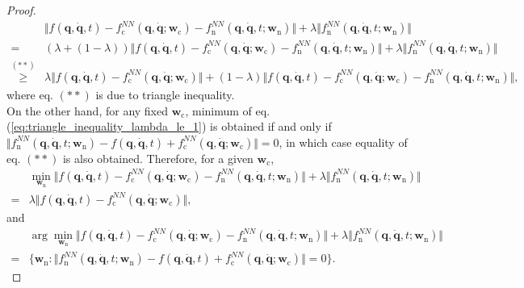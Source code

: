 \documentclass[aps,pre,reprint,superscriptaddress,nofootinbib,amsmath,amssymb]{revtex4-2}
\newcommand{\mat}[1]{\mathbf{#1}}
\newcommand{\q}{\mat{q}}
\newcommand{\qd}{\dot{\mat{q}}}
\begin{document}
\begin{proof}
	\begin{align}
		\nonumber
		&\Vert f(\q,\qd,t)-f_{\mathrm{c}}^{NN}(\q,\qd;\boldsymbol{w}_{\mathrm{c}})-f_{\mathrm{n}}^{NN}(\q,\qd,t;\boldsymbol{w}_{\mathrm{n}})\Vert +\lambda \Vert f_{\mathrm{n}}^{NN}(\q,\qd,t;\boldsymbol{w}_{\mathrm{n}})\Vert
		\\
		\nonumber
		=&(\lambda+(1-\lambda))\Vert f(\q,\qd,t)-f_{\mathrm{c}}^{NN}(\q,\qd;\boldsymbol{w}_{\mathrm{c}})-f_{\mathrm{n}}^{NN}(\q,\qd,t;\boldsymbol{w}_{\mathrm{n}})\Vert+\lambda\Vert f_{\mathrm{n}}^{NN}(\q,\qd,t;\boldsymbol{w}_{\mathrm{n}})\Vert 
		\\
		\label{eq:triangle_inequality_lambda_le_1}
		\overset{(**)}{\ge}& \lambda\Vert f(\q,\qd,t)-f_{\mathrm{c}}^{NN}(\q,\qd;\boldsymbol{w}_{\mathrm{c}})\Vert
		+(1-\lambda) \Vert f(\q,\qd,t)-f_{\mathrm{c}}^{NN}(\q,\qd;\boldsymbol{w}_{\mathrm{c}})-f_{\mathrm{n}}^{NN}(\q,\qd,t;\boldsymbol{w}_{\mathrm{n}})\Vert,
	\end{align}
	where eq. $(**)$ is due to triangle inequality.
	\\
	On the other hand, for any fixed $\boldsymbol{w}_{\mathrm{c}}$, minimum of eq. (\ref{eq:triangle_inequality_lambda_le_1}) is obtained if and only if $\Vert f_{\mathrm{n}}^{NN}(\q,\qd,t;\boldsymbol{w}_{\mathrm{n}})-f(\q,\qd,t)+f_{\mathrm{c}}^{NN}(\q,\qd;\boldsymbol{w}_{\mathrm{c}})\Vert=0$, in which case equality of eq. $(**)$ is also obtained. Therefore, for a given $\boldsymbol{w}_{\mathrm{c}}$,
	\begin{align*}
		&\min_{\boldsymbol{w}_{\mathrm{n}}}\Vert f(\q,\qd,t)-f_{\mathrm{c}}^{NN}(\q,\qd;\boldsymbol{w}_{\mathrm{c}})-f_{\mathrm{n}}^{NN}(\q,\qd,t;\boldsymbol{w}_{\mathrm{n}})\Vert +\lambda \Vert f_{\mathrm{n}}^{NN}(\q,\qd,t;\boldsymbol{w}_{\mathrm{n}})\Vert
		\\
		=&\lambda\Vert f(\q,\qd,t)-f_{\mathrm{c}}^{NN}(\q,\qd;\boldsymbol{w}_{\mathrm{c}})\Vert,
	\end{align*}
	and 
	\begin{align}
		\nonumber
		&\arg\min_{\boldsymbol{w}_{\mathrm{n}}}\Vert f(\q,\qd,t)-f_{\mathrm{c}}^{NN}(\q,\qd;\boldsymbol{w}_{\mathrm{c}})-f_{\mathrm{n}}^{NN}(\q,\qd,t;\boldsymbol{w}_{\mathrm{n}})\Vert +\lambda \Vert f_{\mathrm{n}}^{NN}(\q,\qd,t;\boldsymbol{w}_{\mathrm{n}})\Vert
		\\
		\label{eq:lambda_le_1_def_w_n}
		=&\{\boldsymbol{w}_{\mathrm{n}}:\Vert f_{\mathrm{n}}^{NN}(\q,\qd,t;\boldsymbol{w}_{\mathrm{n}})-f(\q,\qd,t)+f_{\mathrm{c}}^{NN}(\q,\qd;\boldsymbol{w}_{\mathrm{c}})\Vert=0\}.
	\end{align}

\end{proof}
\end{document}
